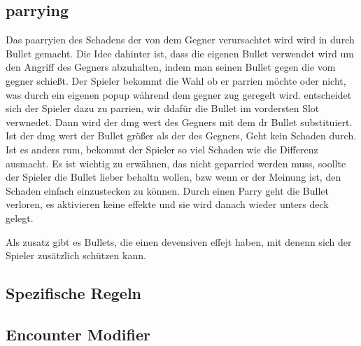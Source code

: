 \subsection{parrying}\label{backpack_and_deck}
Das paarryien des Schadens der von dem Gegner verursachtet wird wird in  \FF durch Bullet gemacht.
Die Idee dahinter ist, dass die eigenen Bullet verwendet wird um den Angriff des Gegners abzuhalten, indem man seinen Bullet gegen die vom gegner schießt.
Der Spieler bekommt die Wahl ob er parrien möchte oder nicht, was durch ein eigenen popup während dem gegner zug geregelt wird.
entscheidet sich der Spieler dazu zu parrien, wir ddafür die Bullet im vordersten Slot verwnedet.
Dann wird der dmg wert des Gegners mit dem dr Bullet substituiert. Ist der dmg wert der Bullet größer als der des Gegners,
Geht kein Schaden durch. Ist es anders rum, bekommt der Spieler so viel Schaden wie die Differenz ausmacht.
Es ist wichtig zu erwähnen, das nicht geparried werden muss, soollte der Spieler die Bullet lieber behaltn wollen,
bzw wenn er der  Meinung ist, den Schaden einfach einzustecken zu können. Durch einen Parry geht die Bullet verloren,
es aktivieren keine effekte und sie wird danach wieder unters deck gelegt.

Als zusatz gibt es Bullets, die einen devensiven effejt haben, mit denenn sich der Spieler zusätzlich schützen kann.

\subsection{Spezifische Regeln}\label{spezifische_regeln}

\subsection{Encounter Modifier}\label{backpack_and_deck}
%

\renewcommand{\kapitelautor}{}
